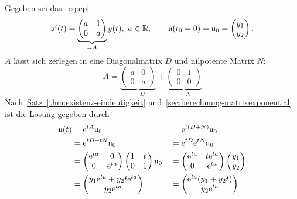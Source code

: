 \begin{example*}
    Gegeben sei das~\ref{eq:cp}
    \begin{equation*}
        \mathfrak{u}'(t) = \underbrace{\begin{pmatrix} a & 1\\ 0 & a \end{pmatrix}}_{= A} y(t),\ a \in \mathbb{R},
        \qquad \mathfrak{u}(t_0 = 0) = \mathfrak{u}_0 = \begin{pmatrix}y_1\\ y_2\end{pmatrix}.
    \end{equation*}
    $A$ lässt sich zerlegen in eine Diagonalmatrix $D$ und nilpotente Matrix $N$:
    \begin{equation*}
        A = \underbrace{\begin{pmatrix} a & 0\\ 0 & a \end{pmatrix}}_{\eqqcolon D}
            + \underbrace{\begin{pmatrix} 0 & 1\\ 0 & 0 \end{pmatrix}}_{\eqqcolon N}
    \end{equation*}
    Nach~\hyperref[thm:existenz-eindeutigkeit]{Satz~\ref*{thm:existenz-eindeutigkeit}} und~\autoref{sec:berechnung-matrixexponential} ist die Lösung gegeben durch
    \begin{alignat*}{2}
        \mathfrak{u}(t) &= \mathrm{e}^{t A} \mathfrak{u}_0
            &&= \mathrm{e}^{t (D + N)} \mathfrak{u}_0\\
        &= \mathrm{e}^{t D + t N} \mathfrak{u}_0
            &&= \mathrm{e}^{t D} \mathrm{e}^{t N} \mathfrak{u}_0\\
        &= \begin{pmatrix} \mathrm{e}^{t a} & 0\\ 0 & \mathrm{e}^{t a} \end{pmatrix} \begin{pmatrix} 1 & t\\ 0 & 1 \end{pmatrix} \mathfrak{u}_0
            &&= \begin{pmatrix} \mathrm{e}^{t a} & t \mathrm{e}^{t a}\\ 0 & \mathrm{e}^{t a} \end{pmatrix} \begin{pmatrix}y_1\\ y_2\end{pmatrix}\\
        &= \begin{pmatrix} y_1 \mathrm{e}^{t a} + y_2 t \mathrm{e}^{t a}\\ y_2 \mathrm{e}^{t a} \end{pmatrix}
            &&= \begin{pmatrix} \mathrm{e}^{t a} (y_1 + y_2 t)\\ y_2 \mathrm{e}^{t a} \end{pmatrix}
    \end{alignat*}
\end{example*}